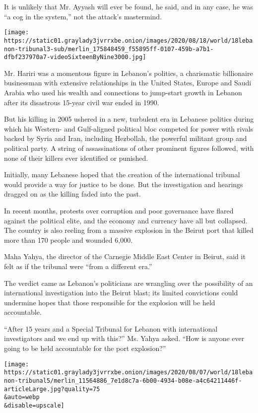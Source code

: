 It is unlikely that Mr. Ayyash will ever be found, he said, and in any
case, he was ``a cog in the system,'' not the attack's mastermind.

\texttt{[image: https://static01.graylady3jvrrxbe.onion/images/2020/08/18/world/18lebanon-tribunal3-sub/merlin\_175848459\_f55895ff-0107-459b-a7b1-dfbf237970a7-videoSixteenByNine3000.jpg]}

Mr. Hariri was a momentous figure in Lebanon's politics, a charismatic
billionaire businessman with extensive relationships in the United
States, Europe and Saudi Arabia who used his wealth and connections to
jump-start growth in Lebanon after its disastrous 15-year civil war
ended in 1990.

But his killing in 2005 ushered in a new, turbulent era in Lebanese
politics during which his Western- and Gulf-aligned political bloc
competed for power with rivals backed by Syria and Iran, including
Hezbollah, the powerful militant group and political party. A string of
assassinations of other prominent figures followed, with none of their
killers ever identified or punished.

Initially, many Lebanese hoped that the creation of the international
tribunal would provide a way for justice to be done. But the
investigation and hearings dragged on as the killing faded into the
past.

In recent months, protests over corruption and poor governance have
flared against the political elite, and the economy and currency have
all but collapsed. The country is also reeling from a massive explosion
in the Beirut port that killed more than 170 people and wounded 6,000.

Maha Yahya, the director of the Carnegie Middle East Center in Beirut,
said it felt as if the tribunal were ``from a different era.''

The verdict came as Lebanon's politicians are wrangling over the
possibility of an international investigation into the Beirut blast; its
limited convictions could undermine hopes that those responsible for the
explosion will be held accountable.

``After 15 years and a Special Tribunal for Lebanon with international
investigators and we end up with this?'' Ms. Yahya asked. ``How is
anyone ever going to be held accountable for the port explosion?''

\texttt{[image: https://static01.graylady3jvrrxbe.onion/images/2020/08/07/world/18lebanon-tribunal5/merlin\_11564886\_7e1d8c7a-6b00-4934-b08e-a4c64211446f-articleLarge.jpg?quality=75\\\&auto=webp\\\&disable=upscale]}

